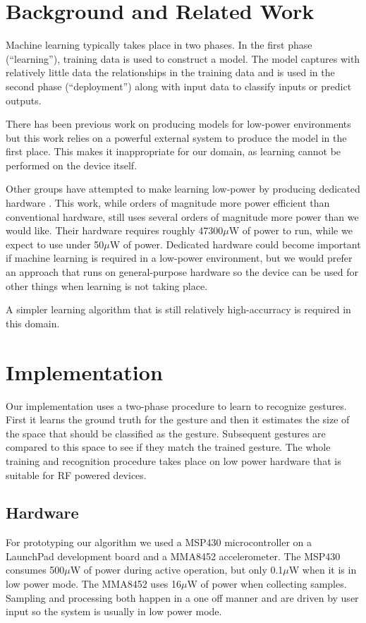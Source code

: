 \documentclass[12pt]{article}
\begin{document}
\section{Background and Related Work}

Machine learning typically takes place in two phases. In the first phase
(``learning''), training data is used to construct a model. The model captures
with relatively little data the relationships in the training data and is used
in the second phase (``deployment'') along with input data to classify inputs
or predict outputs.

There has been previous work on producing models for low-power environments
\cite{low-power-models} but this work relies on a powerful external system to
produce the model in the first place. This makes it inappropriate for our
domain, as learning cannot be performed on the device itself.

Other groups have attempted to make learning low-power by producing dedicated
hardware \cite{ml-on-a-chip}. This work, while orders of magnitude more
power efficient than conventional hardware, still uses several
orders of magnitude more power than we would like. Their hardware requires
roughly 47300{$\mu$}W of power to run, while we expect to use under 50{$\mu$}W of
power. Dedicated hardware could become important if machine learning is
required in a low-power environment, but we would prefer an approach that runs
on general-purpose hardware so the device can be used for other things when
learning is not taking place.

A simpler learning algorithm that is still relatively high-accurracy is
required in this domain.

\section{Implementation}
Our implementation uses a two-phase procedure to learn to recognize gestures. First it learns the ground truth for the gesture and then it estimates the size of the space that should be classified as the gesture. Subsequent gestures are compared to this space to see if they match the trained gesture. The whole training and recognition procedure takes place on low power hardware that is suitable for RF powered devices.

\subsection{Hardware}
For prototyping our algorithm we used a MSP430 microcontroller on a LaunchPad development board and a MMA8452 accelerometer. The MSP430 consumes 500{$\mu$}W of power during active operation, but only 0.1{$\mu$}W when it is in low power mode. The MMA8452 uses 16{$\mu$}W of power when collecting samples. Sampling and processing both happen in a one off manner and are driven by user input so the system is usually in low power mode.
\end{document}
